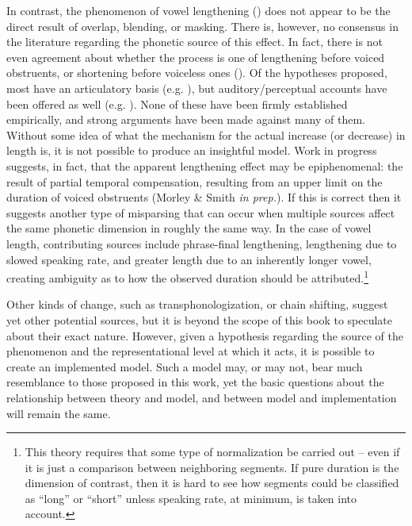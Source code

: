 In contrast, the phenomenon of vowel lengthening ()
does not appear to be the direct result of overlap, blending, or masking.
There is, however, no consensus in the literature regarding the phonetic
source of this effect. In fact, there is not even agreement about
whether the process is one of lengthening before voiced obstruents,
or shortening before voiceless ones (\citealt{gimson1970introduction,wells1982accents}).
Of the hypotheses proposed, most have an articulatory basis (e.g.
\citealt{belasco1958variations,delattre1962some,chen1970vowel,lisker1974explaining,Klatt1976,moreton2004realization,schwartz2010phonology}),
but auditory/perceptual accounts have been offered as well (e.g.
\citealt{lisker1957closure,javkin1977phonetic,Kluender1988}). None
of these have been firmly established empirically, and strong arguments
have been made against many of them. Without some idea of what the
mechanism for the actual increase (or decrease) in length is, it is
not possible to produce an insightful model. Work in progress suggests,
in fact, that the apparent lengthening effect may be epiphenomenal:
the result of partial temporal compensation, resulting from an upper
limit on the duration of voiced obstruents (Morley \& Smith \emph{in
prep.}). If this is correct then it suggests another type of misparsing
that can occur when multiple sources affect the same phonetic dimension
in roughly the same way. In the case of vowel length, contributing
sources include phrase-final lengthening, lengthening due to slowed
speaking rate, and greater length due to an inherently longer vowel,
creating ambiguity as to how the observed duration should be attributed.\footnote{This theory requires that some type of normalization be carried out
– even if it is just a comparison between neighboring segments. If
pure duration is the dimension of contrast, then it is hard to see
how segments could be classified as ``long'' or ``short'' unless speaking
rate, at minimum, is taken into account.}

Other kinds of change, such as transphonologization, or chain shifting,
suggest yet other potential sources, but it is beyond the scope
of this book to speculate about their exact nature. However, given
a hypothesis regarding the source of the phenomenon and the representational
level at which it acts, it is possible to create an implemented model.
Such a model may, or may not, bear much resemblance to those proposed
in this work, yet the basic questions about the relationship between
theory and model, and between model and implementation will remain
the same. 

